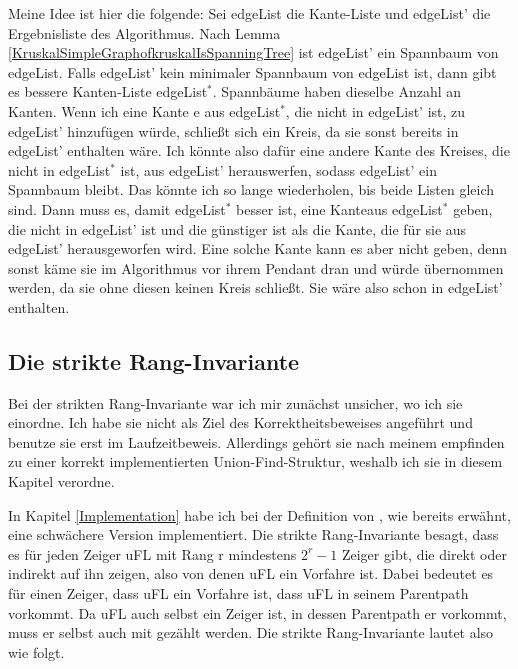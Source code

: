Meine Idee ist hier die folgende:
Sei edgeList die Kante-Liste und edgeList' die Ergebnisliste des Algorithmus.
Nach Lemma \ref{KruskalSimpleGraphofkruskalIsSpanningTree} ist edgeList' ein Spannbaum von edgeList.
Falls edgeList' kein minimaler Spannbaum von edgeList ist, dann gibt es bessere Kanten-Liste edgeList$^*$.
Spannbäume haben dieselbe Anzahl an Kanten.
Wenn ich eine Kante e aus edgeList$^*$, die nicht in edgeList' ist, zu edgeList' hinzufügen würde, schließt sich ein Kreis, da sie sonst bereits in edgeList' enthalten wäre.
Ich könnte also dafür eine andere Kante des Kreises, die nicht in edgeList$^*$ ist, aus edgeList' herauswerfen, sodass edgeList' ein Spannbaum bleibt.
Das könnte ich so lange wiederholen, bis beide Listen gleich sind.
Dann muss es, damit edgeList$^*$ besser ist, eine Kanteaus edgeList$^*$ geben, die nicht in edgeList' ist und die günstiger ist als die Kante, die für sie aus edgeList' herausgeworfen wird.
Eine solche Kante kann es aber nicht geben, denn sonst käme sie im Algorithmus vor ihrem Pendant dran und würde übernommen werden, da sie ohne diesen keinen Kreis schließt.
Sie wäre also schon in edgeList' enthalten.

\subsection{Die strikte Rang-Invariante}\label{strikteRangInvariante}

Bei der strikten Rang-Invariante war ich mir zunächst unsicher, wo ich sie einordne.
Ich habe sie nicht als Ziel des Korrektheitsbeweises angeführt und benutze sie erst im Laufzeitbeweis.
Allerdings gehört sie nach meinem empfinden zu einer korrekt implementierten Union-Find-Struktur, weshalb ich sie in diesem Kapitel verordne.

In Kapitel \ref{Implementation} habe ich bei der Definition von \KruskalunionFind, wie bereits erwähnt, eine schwächere Version implementiert.
Die strikte Rang-Invariante besagt, dass es für jeden Zeiger uFL mit Rang r mindestens $2^r-1$ Zeiger gibt, die direkt oder indirekt auf ihn zeigen, also von denen uFL ein Vorfahre ist.
Dabei bedeutet es für einen Zeiger, dass uFL ein Vorfahre ist, dass uFL in seinem Parentpath vorkommt.
Da uFL auch selbst ein Zeiger ist, in dessen Parentpath er vorkommt, muss er selbst auch mit gezählt werden.
Die strikte Rang-Invariante lautet also wie folgt.

